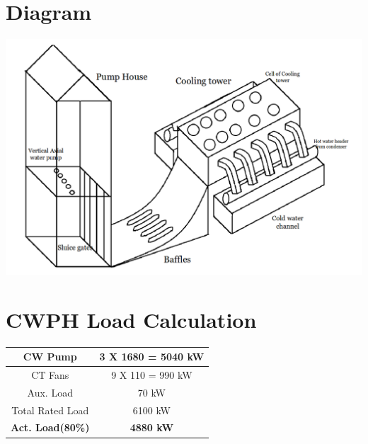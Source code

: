 \documentclass[english,11pt]{report}
\begin{document}
\section{Diagram}
\includegraphics[width =6in]{cooling}
\section{CWPH Load Calculation}
\begin{center}
\begin{tabular}{|c|c|}
\hline
  CW Pump & 3 X 1680 = 5040 kW \\ \hline
  CT Fans & 9 X 110 = 990 kW \\ \hline
  Aux. Load & 70 kW \\ \hline
  Total Rated Load & 6100 kW \\ \hline
  \textbf{Act. Load(80\%)} & \textbf{4880 kW}\\
  \hline
  
\end{tabular}
\end{center}
\end{document}
